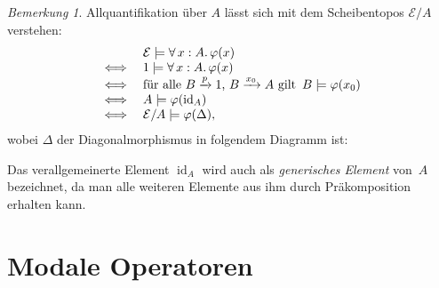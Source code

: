 \documentclass{article}
\theoremstyle{definition}
\theoremstyle{remark}
\newtheorem*{bem}{Bemerkung}
\newcommand{\?}{\,{:}\,}
\renewcommand{\_}{\mathpunct{.}\,}
\newcommand{\fa}[1]{\forall \, {#1} .\,}
\DeclareMathOperator{\id}{id} %
\newcommand{\Eat}{\mathcal{E}} %
\begin{document}
\begin{bem}
  Allquantifikation über $A$ lässt sich mit dem Scheibentopos $\Eat/A$ verstehen:
  \[
    \begin{array}{r l}
      & \Eat \models \fa{x:A} \varphi(x) \\
      \iff & 1 \models \fa{x:A} \varphi(x) \\
      \iff & \text{für alle $B \xrightarrow{p} 1$, $B \xrightarrow{x_0} A$ gilt} \enspace B \models \varphi(x_0) \\
      \iff & A \models \varphi(\id_A) \\
      \iff & \Eat/A \models \varphi(\Delta), \\
    \end{array}
  \]
  wobei $\Delta$ der Diagonalmorphismus in folgendem Diagramm ist:
  \begin{center}\end{center}
  Das verallgemeinerte Element $\id_A$ wird auch als \emph{generisches Element} von~$A$ bezeichnet, da man alle weiteren Elemente aus ihm durch Präkomposition erhalten kann.
\end{bem}

\section{Modale Operatoren}
\end{document}
